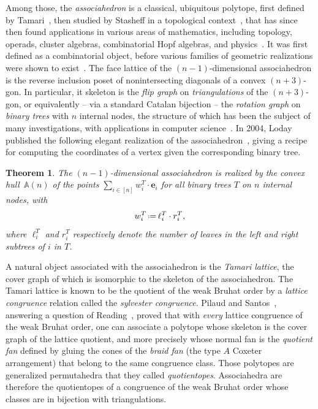\documentclass{amsart}
\newtheorem{theorem}{Theorem}%
\theoremstyle{definition}
\newcommand{\eqdef}{\mbox{\,\raisebox{0.2ex}{\scriptsize\ensuremath{\mathrm:}}\ensuremath{=}\,}} %
\newcommand{\darkblue}{\color{darkblue}} %
\newcommand{\defn}[1]{\textsl{\darkblue #1}} %
\newcommand{\polytope}[1]{\mathds{#1}} %
\newcommand{\Asso}{\polytope{A}} %
\begin{document}
Among those, the \defn{associahedron} is a classical, ubiquitous polytope, first defined by Tamari~\cite{T51}, then studied by Stasheff in a topological context~\cite{S63}, that has since then found applications in various areas of mathematics, including topology, operads, cluster algebras, combinatorial Hopf algebras, and physics~\cite{MR4675114}.
It was first defined as a combinatorial object, before various families of geometric realizations were shown to exist~\cite{MR1022776,MR1941227,MR2108555,MR3437894}.
The face lattice of the $(n-1)$-dimensional associahedron is the reverse inclusion poset of nonintersecting diagonals of a convex $(n+3)$-gon.
In particular, it skeleton is the \defn{flip graph} on \defn{triangulations} of the $(n+3)$-gon, or equivalently -- via a standard Catalan bijection -- the \defn{rotation graph} on \defn{binary trees} with $n$ internal nodes, the structure of which has been the subject of many investigations, with applications in computer science~\cite{MR928904,MR3197650}.
In 2004, Loday published the following elegant realization of the associahedron~\cite{MR2108555}, giving a recipe for computing the coordinates of a vertex given the corresponding binary tree.

\begin{theorem}
  \label{thm:loday}
  The $(n-1)$-dimensional associahedron is realized by the convex hull~$\Asso (n)$ of the points
  $\sum_{i\in [n]} w^T_i \cdot \mathbf{e}_i$ for all binary trees $T$ on $n$ internal nodes, with
  \[
  w^T_i \eqdef \ell^T_i\cdot r^T_i,
  \]
  where $\ell^T_i$ and $r^T_i$ respectively denote the number of leaves in the left and right subtrees of $i$ in $T$.
\end{theorem}

A natural object associated with the associahedron is the \defn{Tamari lattice}, the cover graph of which is isomorphic to the skeleton of the associahedron.
The Tamari lattice is known to be the quotient of the weak Bruhat order by a \defn{lattice congruence} relation called the \defn{sylvester congruence}.
Pilaud and Santos~\cite{MR3964495}, answering a question of Reading~\cite{MR2142177}, proved that with \emph{every} lattice congruence of the weak Bruhat order, one can associate a polytope whose skeleton is the cover graph of the lattice quotient, and more precisely whose normal fan is the \defn{quotient fan} defined by gluing the cones of the \defn{braid fan} (the type $A$ Coxeter arrangement) that belong to the same congruence class.
Those polytopes are generalized permutahedra that they called \defn{quotientopes}.
Associahedra are therefore the quotientopes of a congruence of the weak Bruhat order whose classes are in bijection with triangulations.
\end{document}

